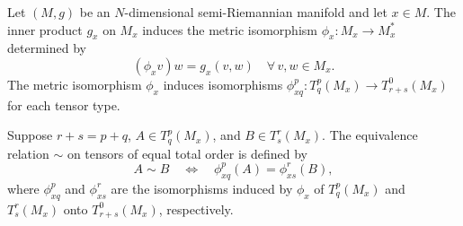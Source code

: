 Let $(M, g)$ be an $N$-dimensional semi-Riemannian manifold and let $x \in M$. The inner product $g_x$ on $M_x$ induces the metric isomorphism $\phi_x: M_x \to M_x^*$ determined by
$$(\phi_x v)w = g_x(v, w) \quad \forall\, v, w \in M_x.$$
The metric isomorphism $\phi_x$ induces isomorphisms $\phi_{xq}^p: T_q^p(M_x) \to T_{r+s}^0(M_x)$ for each tensor type.

Suppose $r + s = p + q$, $A \in T_q^p(M_x)$, and $B \in T_s^r(M_x)$. The equivalence relation $\sim$ on tensors of equal total order is defined by
$$A \sim B \quad \iff \quad \phi_{xq}^p(A) = \phi_{xs}^r(B),$$
where $\phi_{xq}^p$ and $\phi_{xs}^r$ are the isomorphisms induced by $\phi_x$ of $T_q^p(M_x)$ and $T_s^r(M_x)$ onto $T_{r+s}^0(M_x)$, respectively.
